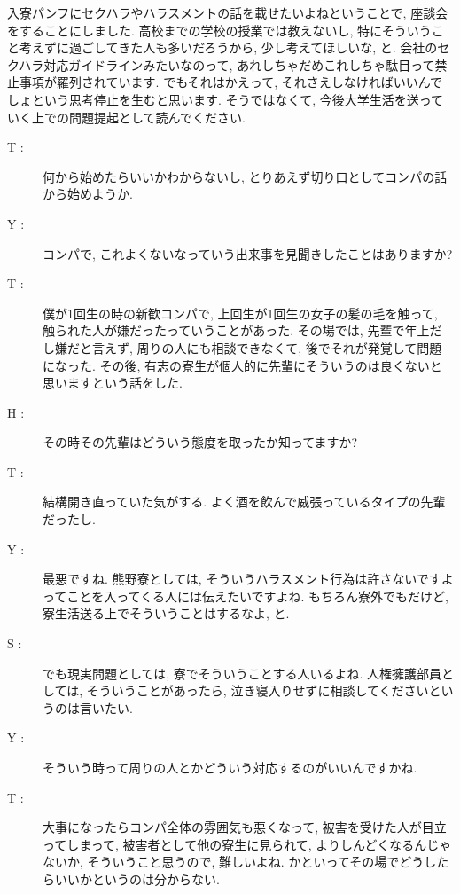 \documentclass[10pt,b5jsbook,dvips,dvipdfmx,openany]{jsbook}
\theoremstyle{definition}
\begin{document}
		 入寮パンフにセクハラやハラスメントの話を載せたいよねということで, 座談会をすることにしました. 高校までの学校の授業では教えないし, 特にそういうこと考えずに過ごしてきた人も多いだろうから, 少し考えてほしいな, と. 会社のセクハラ対応ガイドラインみたいなのって, あれしちゃだめこれしちゃ駄目って禁止事項が羅列されています. でもそれはかえって, それさえしなければいいんでしょという思考停止を生むと思います. そうではなくて, 今後大学生活を送っていく上での問題提起として読んでください.
\small
		\begin{multicols}{2}

		\begin{description}

		\item[ T : ] 何から始めたらいいかわからないし, とりあえず切り口としてコンパの話から始めようか.

		\item[ Y : ] コンパで, これよくないなっていう出来事を見聞きしたことはありますか?

		\item[ T : ] 僕が1回生の時の新歓コンパで, 上回生が1回生の女子の髪の毛を触って, 触られた人が嫌だったっていうことがあった. その場では, 先輩で年上だし嫌だと言えず, 周りの人にも相談できなくて, 後でそれが発覚して問題になった. その後, 有志の寮生が個人的に先輩にそういうのは良くないと思いますという話をした.

		\item[ H : ]その時その先輩はどういう態度を取ったか知ってますか?

		\item[ T : ] 結構開き直っていた気がする. よく酒を飲んで威張っているタイプの先輩だったし.

		\item[ Y : ] 最悪ですね. 熊野寮としては, そういうハラスメント行為は許さないですよってことを入ってくる人には伝えたいですよね. もちろん寮外でもだけど, 寮生活送る上でそういうことはするなよ, と.

		\item[ S : ] でも現実問題としては, 寮でそういうことする人いるよね. 人権擁護部員としては, そういうことがあったら, 泣き寝入りせずに相談してくださいというのは言いたい.

		\item[ Y : ] そういう時って周りの人とかどういう対応するのがいいんですかね.

		\item[ T : ] 大事になったらコンパ全体の雰囲気も悪くなって, 被害を受けた人が目立ってしまって, 被害者として他の寮生に見られて, よりしんどくなるんじゃないか, そういうこと思うので, 難しいよね. かといってその場でどうしたらいいかというのは分からない.


\end{description}
\end{multicols}
\end{document}
